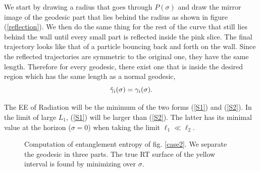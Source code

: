 We start by drawing a radius that goes through $P(\sigma)$ and draw the mirror image of the geodesic part that lies behind the radius as shown in figure (\ref{reflection}). We then do the same thing for the rest of the curve that still lies behind the wall until every small part is reflected inside the pink slice. The final trajectory looks like that of a particle bouncing back and forth on the wall. Since the reflected trajectories are symmetric to the original one, they have the same length. Therefore for every geodesic, there exist one that is inside the desired region which has the same length as a normal geodesic,
\begin{equation}
    \Tilde{\gamma}_i(\sigma) = \gamma_i(\sigma).
\end{equation}

The EE of Radiation will be the minimum of the two forms (\ref{S1}) and (\ref{S2}). In the limit of large $L_1$, (\ref{S1}) will be larger than (\ref{S2}). The latter has its minimal value at the horizon ($\sigma=0$) when taking the limit  $\ell_1\ll\ell_2$.

\begin{figure}
    \centering
    \caption{Computation of entanglement entropy of fig. \ref{case2}. We separate the geodesic in three parts. The true RT surface of the yellow interval is found by minimizing over $\sigma$.}
    \label{case2separated}
\end{figure}